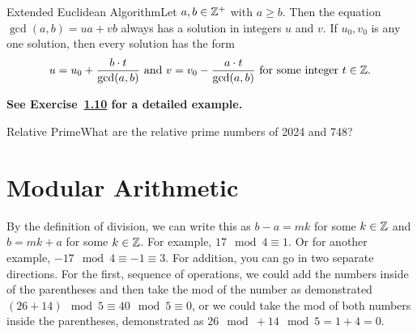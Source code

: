 
\begin{theorem}
{Extended Euclidean Algorithm}Let \(a,b \in \mathbb{Z}^+\) with \(a \geq b\). Then the equation \(\gcd(a,b) = ua + vb\) always has a solution in integers \(u\) and \(v\). If \(u_0,v_0\) is any one solution, then every solution has the form \[u = u_0 + \frac{b \cdot t}{\gcd(a,b)} \text{ and } v = v_0 - \frac{a \cdot t}{\gcd(a,b)} \text{ for some integer } t \in \mathbb{Z}.\]
\end{theorem}

\textbf{See Exercise~\hyperlink{ex:1.10}{1.10} for a detailed example.}

\begin{example}
    {Relative Prime}What are the relative prime numbers of 2024 and 748?
\end{example}


\section{Modular Arithmetic}


By the definition of division, we can write this as $b - a = mk$ for some $k \in \mathbb{Z}$ and $b = mk + a$ for some $k \in \mathbb{Z}$. For example, $17\mod 4 \equiv 1$. Or for another example, $-17\mod 4 \equiv -1 \equiv 3$. For addition, you can go in two separate directions. For the first, sequence of operations, we could add the numbers inside of the parentheses and then take the mod of the number as demonstrated $(26 + 14)\mod 5 \equiv 40 \mod 5 \equiv 0$, or we could take the mod of both numbers inside the parentheses, demonstrated as $26\mod + 14\mod 5 = 1 + 4 = 0$. \\

